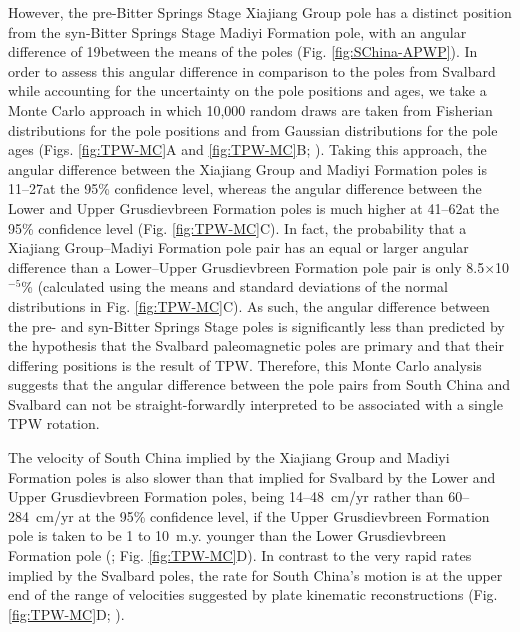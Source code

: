 However, the pre-Bitter Springs Stage Xiajiang Group pole has a distinct position from the syn-Bitter Springs Stage Madiyi Formation pole, with an angular difference of 19\degrees between the means of the poles (Fig. \ref{fig:SChina-APWP}). In order to assess this angular difference in comparison to the poles from Svalbard while accounting for the uncertainty on the pole positions and ages, we take a Monte Carlo approach in which 10,000 random draws are taken from Fisherian distributions for the pole positions and from Gaussian distributions for the pole ages (Figs. \ref{fig:TPW-MC}A and \ref{fig:TPW-MC}B; \citealp{Swanson-Hysell2014b}). Taking this approach, the angular difference between the Xiajiang Group and Madiyi Formation poles is 11--27\degrees at the 95\% confidence level, whereas the angular difference between the Lower and Upper Grusdievbreen Formation poles is much higher at 41--62\degrees at the 95\% confidence level (Fig. \ref{fig:TPW-MC}C). In fact, the probability that a Xiajiang Group--Madiyi Formation pole pair has an equal or larger angular difference than a Lower--Upper Grusdievbreen Formation pole pair is only 8.5$\times$10$^{-5}$\% (calculated using the means and standard deviations of the normal distributions in Fig. \ref{fig:TPW-MC}C). As such, the angular difference between the pre- and syn-Bitter Springs Stage poles is significantly less than predicted by the hypothesis that the Svalbard paleomagnetic poles are primary and that their differing positions is the result of TPW. Therefore, this Monte Carlo analysis suggests that the angular difference between the pole pairs from South China and Svalbard can not be straight-forwardly interpreted to be associated with a single TPW rotation.

The velocity of South China implied by the Xiajiang Group and Madiyi Formation poles is also slower than that implied for Svalbard by the Lower and Upper Grusdievbreen Formation poles, being 14--48~cm/yr rather than 60--284~cm/yr at the 95\% confidence level, if the Upper Grusdievbreen Formation pole is taken to be 1 to 10~m.y. younger than the Lower Grusdievbreen Formation pole (\citealp{Maloof2006a}; Fig. \ref{fig:TPW-MC}D). In contrast to the very rapid rates implied by the Svalbard poles, the rate for South China's motion is at the upper end of the range of velocities suggested by plate kinematic reconstructions (Fig. \ref{fig:TPW-MC}D; \citealp{Meert1993a, Zahirovic2015a}).

